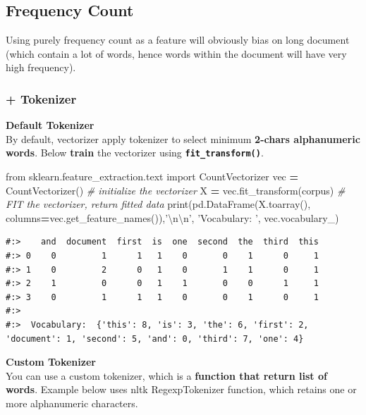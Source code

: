 \documentclass[
]{book}
\newenvironment{Shaded}{\begin{snugshade}}{\end{snugshade}}
\newcommand{\BuiltInTok}[1]{#1}
\newcommand{\CharTok}[1]{\textcolor[rgb]{0.5,0.5,0.5}{#1}}
\newcommand{\CommentTok}[1]{\textcolor[rgb]{0.37,0.37,0.37}{\textit{#1}}}
\newcommand{\ImportTok}[1]{#1}
\newcommand{\NormalTok}[1]{#1}
\newcommand{\OperatorTok}[1]{\textcolor[rgb]{0.43,0.43,0.43}{\textbf{#1}}}
\newcommand{\StringTok}[1]{\textcolor[rgb]{0.5,0.5,0.5}{#1}}
\begin{document}
\hypertarget{frequency-count-1}{%
\subsection{Frequency Count}\label{frequency-count-1}}

Using purely frequency count as a feature will obviously bias on long document (which contain a lot of words, hence words within the document will have very high frequency).

\hypertarget{tokenizer}{%
\subsubsection{+ Tokenizer}\label{tokenizer}}

\textbf{Default Tokenizer}\\
By default, vectorizer apply tokenizer to select minimum \textbf{2-chars alphanumeric words}. Below \textbf{train} the vectorizer using \textbf{\texttt{fit\_transform()}}.

\begin{Shaded}
\begin{Highlighting}[]
\ImportTok{from}\NormalTok{ sklearn.feature_extraction.text }\ImportTok{import}\NormalTok{ CountVectorizer}
\NormalTok{vec }\OperatorTok{=}\NormalTok{ CountVectorizer()          }\CommentTok{# initialize the vectorizer}
\NormalTok{X   }\OperatorTok{=}\NormalTok{ vec.fit_transform(corpus)  }\CommentTok{# FIT the vectorizer, return fitted data}
\BuiltInTok{print}\NormalTok{(pd.DataFrame(X.toarray(), columns}\OperatorTok{=}\NormalTok{vec.get_feature_names()),}\StringTok{'}\CharTok{\textbackslash{}n\textbackslash{}n}\StringTok{'}\NormalTok{,}
      \StringTok{'Vocabulary: '}\NormalTok{, vec.vocabulary_)}
\end{Highlighting}
\end{Shaded}

\begin{verbatim}
#:>    and  document  first  is  one  second  the  third  this
#:> 0    0         1      1   1    0       0    1      0     1
#:> 1    0         2      0   1    0       1    1      0     1
#:> 2    1         0      0   1    1       0    0      1     1
#:> 3    0         1      1   1    0       0    1      0     1 
#:> 
#:>  Vocabulary:  {'this': 8, 'is': 3, 'the': 6, 'first': 2, 'document': 1, 'second': 5, 'and': 0, 'third': 7, 'one': 4}
\end{verbatim}

\textbf{Custom Tokenizer}\\
You can use a custom tokenizer, which is a \textbf{function that return list of words}. Example below uses nltk RegexpTokenizer function, which retains one or more alphanumeric characters.
\end{document}

